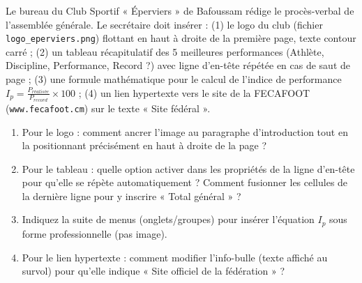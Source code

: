 \documentclass[11pt]{article}
\begin{document}
\begin{exercice}
Le bureau du Club Sportif « Éperviers » de Bafoussam rédige le procès-verbal de l'assemblée générale. Le secrétaire doit insérer : (1) le logo du club (fichier \texttt{logo\_eperviers.png}) flottant en haut à droite de la première page, texte contour carré ; (2) un tableau récapitulatif des 5 meilleures performances (Athlète, Discipline, Performance, Record ?) avec ligne d'en-tête répétée en cas de saut de page ; (3) une formule mathématique pour le calcul de l'indice de performance $I_p = \frac{P_{réalisée}}{P_{record}} \times 100$ ; (4) un lien hypertexte vers le site de la FECAFOOT (\texttt{www.fecafoot.cm}) sur le texte « Site fédéral ».
\begin{enumerate}
    \item Pour le logo : comment ancrer l'image au paragraphe d'introduction tout en la positionnant précisément en haut à droite de la page ?
    \item Pour le tableau : quelle option activer dans les propriétés de la ligne d'en-tête pour qu'elle se répète automatiquement ? Comment fusionner les cellules de la dernière ligne pour y inscrire « Total général » ?
    \item Indiquez la suite de menus (onglets/groupes) pour insérer l'équation $I_p$ sous forme professionnelle (pas image).
    \item Pour le lien hypertexte : comment modifier l'info-bulle (texte affiché au survol) pour qu'elle indique « Site officiel de la fédération » ?
\end{enumerate}
\end{exercice}
\end{document}
